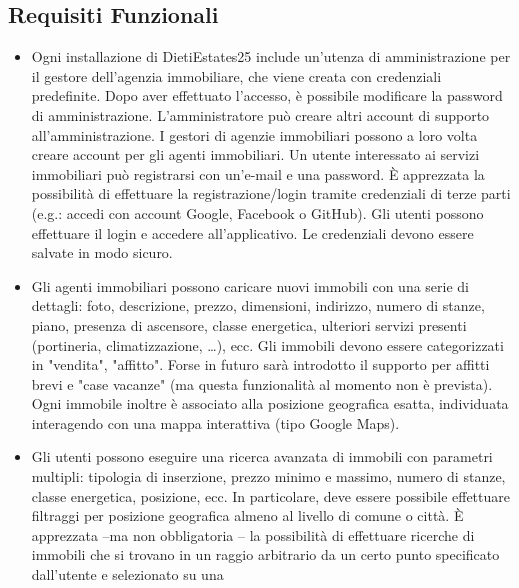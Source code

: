         \subsection{Requisiti Funzionali}
            \begin{itemize}
                \item Ogni installazione di DietiEstates25 include un’utenza di amministrazione per il gestore
                dell’agenzia immobiliare, che viene creata con credenziali predefinite. Dopo aver effettuato
                l’accesso, è possibile modificare la password di amministrazione. L’amministratore può creare
                altri account di supporto all’amministrazione. I gestori di agenzie immobiliari possono a loro volta
                creare account per gli agenti immobiliari. Un utente interessato ai servizi immobiliari può
                registrarsi con un’e-mail e una password. È apprezzata la possibilità di effettuare la
                registrazione/login tramite credenziali di terze parti (e.g.: accedi con account Google, Facebook o
                GitHub). Gli utenti possono effettuare il login e accedere all’applicativo. Le credenziali devono
                essere salvate in modo sicuro.
                \item Gli agenti immobiliari possono caricare nuovi immobili con una serie di dettagli: foto, descrizione,
                prezzo, dimensioni, indirizzo, numero di stanze, piano, presenza di ascensore, classe energetica,
                ulteriori servizi presenti (portineria, climatizzazione, …), ecc. Gli immobili devono essere
                categorizzati in "vendita", "affitto". Forse in futuro sarà introdotto il supporto per affitti brevi e "case
                vacanze" (ma questa funzionalità al momento non è prevista). Ogni immobile inoltre è associato
                alla posizione geografica esatta, individuata interagendo con una mappa interattiva (tipo Google
                Maps).
                \item Gli utenti possono eseguire una ricerca avanzata di immobili con parametri multipli: tipologia di
                inserzione, prezzo minimo e massimo, numero di stanze, classe energetica, posizione, ecc. In
                particolare, deve essere possibile effettuare filtraggi per posizione geografica almeno al livello di
                comune o città. È apprezzata –ma non obbligatoria – la possibilità di effettuare ricerche di immobili
                che si trovano in un raggio arbitrario da un certo punto specificato dall’utente e selezionato su una

\end{itemize}
